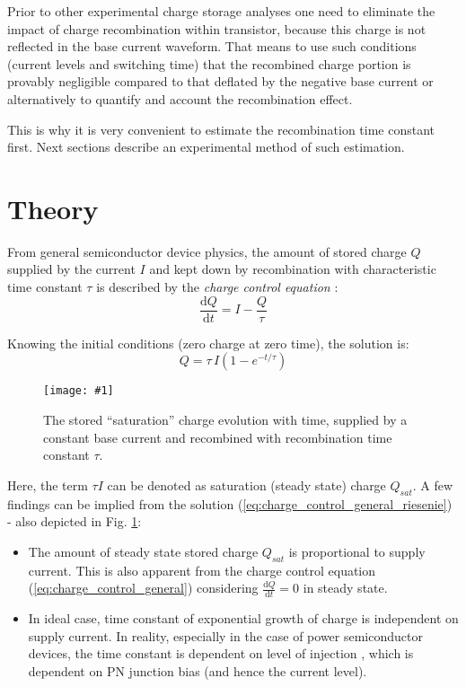 \documentclass{eeict}
\newcommand{\dxdt}[2]{\frac{\mathrm{d} #1}{\mathrm{d} #2}}
\newcommand{\myfig}[3]
{
    \begin{figure}[!ht]
	\centering
	\texttt{[image: \#1]}
	\caption{#2}
	#3
    \end{figure}
}
\begin{document}
Prior to other experimental charge storage analyses one need to eliminate the impact of charge recombination within transistor, because this charge is not reflected in the base current waveform. That means to use such conditions (current levels and switching time) that the recombined charge portion is provably negligible compared to that deflated by the negative base current or alternatively to quantify and account the recombination effect.

This is why it is very convenient to estimate the recombination time constant first. Next sections describe an experimental method of such estimation.




\section{Theory} \label{sec:theory}

From general semiconductor device physics, the amount of stored charge $Q$ supplied by the current $I$ and kept down by recombination with characteristic time constant $\tau$ \cite{pierret} is described by the \textit{charge control equation} \cite{pierret} \cite{sze}:
\begin{equation}
    \dxdt{Q}{t} = I - \frac{Q}{\tau}
    \label{eq:charge_control_general}
\end{equation}

Knowing the initial conditions (zero charge at zero time), the solution is:
\begin{equation}
    Q = \tau \,I \left( 1-e^{-t/\tau} \right)
    \label{eq:charge_control_general_riesenie}
\end{equation}

\myfig{Q_exp}{The stored ``saturation'' charge evolution with time, supplied by a constant base current and recombined with recombination time constant $\tau$.}{\label{fig:Q_exp}}

Here, the term $\tau I$ can be denoted as saturation (steady state) charge $Q_{sat}$. A few findings can be implied from the solution (\ref{eq:charge_control_general_riesenie}) - also depicted in Fig. \ref{fig:Q_exp}:
\begin{itemize}
    \item The amount of steady state stored charge $Q_{sat}$ is proportional to supply current. This is also apparent from the charge control equation (\ref{eq:charge_control_general}) considering $\dxdt{Q}{t}=0$ in steady state.
    \item In ideal case, time constant of exponential growth of charge is independent on supply current. In reality, especially in the case of power semiconductor devices, the time constant is dependent on level of injection \cite{baliga}, which is dependent on PN junction bias (and hence the current level).
\end{itemize}
\end{document}
